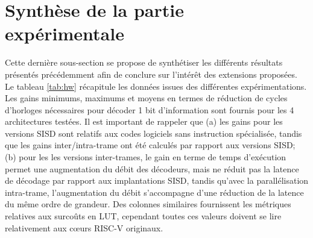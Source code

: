 \documentclass[../main.tex]{subfiles}
\begin{document}
\section{Synthèse de la partie expérimentale}
%
%
%
Cette dernière sous-section se propose de synthétiser les différents résultats présentés  précédemment afin de conclure sur l'intérêt des extensions proposées. 
Le tableau \ref{tab:hw} récapitule les données issues des différentes expérimentations. 
Les gains minimums, maximums et moyens en termes de réduction de cycles d'horloges nécessaires pour décoder 1 bit d'information sont fournis pour les 4 architectures testées. 
Il est important de rappeler que (a) les gains pour les versions SISD sont relatifs aux codes logiciels sans instruction spécialisée, tandis que les gains inter/intra-trame ont été calculés par rapport aux versions SISD;  (b) pour les les versions inter-trames, le gain en terme de temps d'exécution permet une augmentation du débit des décodeurs, mais ne réduit pas la latence de décodage par rapport aux implantations SISD, tandis qu'avec la parallélisation intra-trame, l'augmentation du débit s'accompagne d'une réduction de la latence du même ordre de grandeur. 
Des colonnes similaires fournissent les métriques relatives aux surcoûts en LUT, cependant toutes ces valeurs doivent se lire relativement aux cœurs RISC-V originaux.
\end{document}
